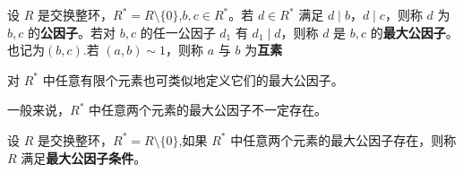 \documentclass[../../main.tex]{subfiles}%
\begin{document}
\begin{definition}
设 \( R \) 是交换整环，\( R^* = R \setminus \{0\} \),\( b, c \in R^* \)。若 \( d \in R^* \) 满足 \( d \mid b \)，\( d \mid c \)，则称 \( d \) 为 \( b, c \) 的\textbf{公因子}。若对 \( b, c \) 的任一公因子 \( d_1 \) 有 \( d_1 \mid d \)，则称 \( d \) 是 \( b, c \) 的\textbf{最大公因子}。也记为$(b,c)$.若 \( (a, b) \sim 1 \)，则称 \( a \) 与 \( b \) 为\textbf{互素}

对 \( R^* \) 中任意有限个元素也可类似地定义它们的最大公因子。
\end{definition}
\begin{remark}
一般来说，\( R^* \) 中任意两个元素的最大公因子不一定存在。
\end{remark}

\begin{definition}
设 \( R \) 是交换整环，\( R^* = R \setminus \{0\} \),如果 \( R^* \) 中任意两个元素的最大公因子存在，则称 \( R \) 满足\textbf{最大公因子条件}。
\end{definition}
\end{document}
